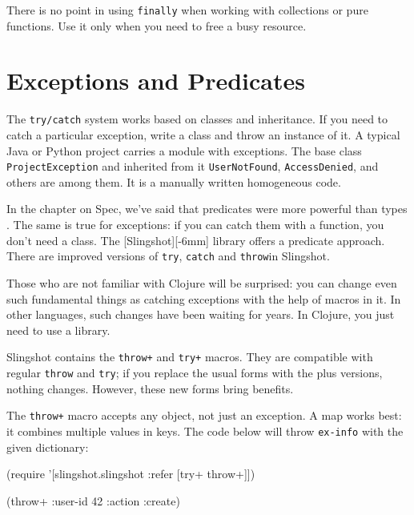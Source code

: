 There is no point in using \verb|finally| when working with collections or pure functions. Use it only when you need to free a busy resource.

\section{Exceptions and Predicates}


The \verb|try/catch| system works based on classes and inheritance. If you need to catch a particular exception, write a class and throw an instance of it. A typical Java or Python project carries a module with exceptions.
The base class \verb|ProjectException| and inherited from it \verb|UserNotFound|, \verb|AccessDenied|, and others are among them. It is a manually written homogeneous code.


In the chapter on Spec, we've said that predicates were more powerful than types . The same is true for exceptions: if you can catch them with a function, you don't need a class. The [Slingshot][-6mm] library offers a predicate approach. There are improved versions of \verb|try|, \verb|catch| and \verb|throw|in Slingshot.

\index{ \fundamentality}

Those who are not familiar with Clojure will be surprised: you can change even such fundamental things as catching exceptions with the help of macros in it. In other languages, such changes have been waiting for years. In Clojure, you just need to use a library.


Slingshot contains the \verb|throw+| and \verb|try+| macros. They are compatible with regular \verb|throw| and \verb|try|; if you replace the usual forms with the plus versions, nothing changes. However, these new forms bring benefits.

The \verb|throw+| macro accepts any object, not just an exception. A map works best: it combines multiple values in keys. The code below will throw \verb|ex-info| with the given dictionary:

\ifx\DEVICETYPE\MOBILE

\begin{english}
  \begin{clojure}
(require
  '[slingshot.slingshot
    :refer [try+ throw+]])

(throw+ {:user-id 42 :action :create})
  \end{clojure}
\end{english}

